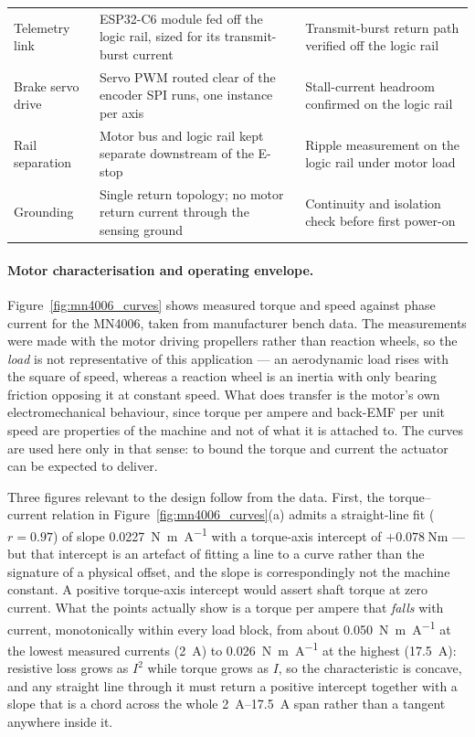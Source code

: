 \begin{table}[htbp]
\begin{tabular}{L{3.2cm} L{5.6cm} L{5.4cm}}
Telemetry link & ESP32-C6 module fed off the logic rail, sized for its transmit-burst current & Transmit-burst return path verified off the logic rail \\
Brake servo drive & Servo PWM routed clear of the encoder SPI runs, one instance per axis & Stall-current headroom confirmed on the logic rail \\
Rail separation & Motor bus and logic rail kept separate downstream of the E-stop & Ripple measurement on the logic rail under motor load \\
Grounding & Single return topology; no motor return current through the sensing ground & Continuity and isolation check before first power-on \\
\bottomrule
\end{tabular}
\end{table}

\paragraph{Motor characterisation and operating envelope.}
Figure~\ref{fig:mn4006_curves} shows measured torque and speed against phase
current for the MN4006, taken from manufacturer bench data. The measurements
were made with the motor driving propellers rather than reaction wheels, so
the \emph{load} is not representative of this application --- an aerodynamic
load rises with the square of speed, whereas a reaction wheel is an inertia
with only bearing friction opposing it at constant speed. What does transfer
is the motor's own electromechanical behaviour, since torque per ampere and
back-EMF per unit speed are properties of the machine and not of what it is
attached to. The curves are used here only in that sense: to bound the torque
and current the actuator can be expected to deliver.

Three figures relevant to the design follow from the data. First, the
torque--current relation in Figure~\ref{fig:mn4006_curves}(a) admits a
straight-line fit ($r = 0.97$) of slope
\qty{0.0227}{\newton\metre\per\ampere} with a torque-axis intercept of
$+\qty{0.078}{\newton\metre}$ --- but that intercept is an artefact of fitting
a line to a curve rather than the signature of a physical offset, and the slope
is correspondingly not the machine constant. A positive torque-axis intercept
would assert shaft torque at zero current. What the points actually show is a
torque per ampere that \emph{falls} with current, monotonically within every
load block, from about \qty{0.050}{\newton\metre\per\ampere} at the lowest
measured currents (\qty{2}{\ampere}) to \qty{0.026}{\newton\metre\per\ampere}
at the highest (\qty{17.5}{\ampere}): resistive loss grows as $I^2$ while
torque grows as $I$, so the characteristic is concave, and any straight line
through it must return a positive intercept together with a slope that is a
chord across the whole \qtyrange{2}{17.5}{\ampere} span rather than a tangent
anywhere inside it.

